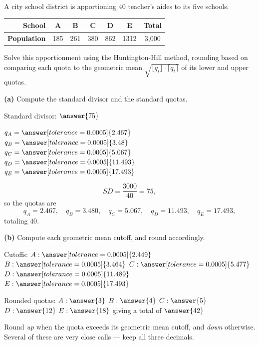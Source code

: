 \documentclass[12pt]{ximera}
\begin{document}
\begin{problem}
A city school district is apportioning $40$ teacher's aides to its five schools.

\begin{center}
\begin{tabular}{|r|c|c|c|c|c|c|}\hline
\textbf{School} & A & B & C & D & E & \textbf{Total} \\\hline
\textbf{Population} & 185 & 261 & 380 & 862 & 1312 & 3{,}000 \\\hline
\end{tabular}
\end{center}

Solve this apportionment using the Huntington-Hill method, rounding based on comparing
each quota to the geometric mean $\sqrt{\lfloor q_i\rfloor \cdot \lceil q_i\rceil}$ of
its lower and upper quotas.

\begin{prompt}
\textbf{(a)} Compute the standard divisor and the standard quotas.

Standard divisor: $\answer{75}$

\smallskip
$q_A = \answer[tolerance=0.0005]{2.467}$ \quad
$q_B = \answer[tolerance=0.0005]{3.48}$ \quad
$q_C = \answer[tolerance=0.0005]{5.067}$ \quad
$q_D = \answer[tolerance=0.0005]{11.493}$ \quad
$q_E = \answer[tolerance=0.0005]{17.493}$

\begin{feedback}
\[ SD = \frac{3000}{40} = 75, \]
so the quotas are
\[
q_A = 2.467,\quad q_B = 3.480,\quad q_C = 5.067,\quad q_D = 11.493,\quad q_E = 17.493,
\]
totaling $40$. \checkmark
\end{feedback}
\end{prompt}

\begin{prompt}
\textbf{(b)} Compute each geometric mean cutoff, and round accordingly.

Cutoffs: $A: \answer[tolerance=0.0005]{2.449}$ \quad
$B: \answer[tolerance=0.0005]{3.464}$ \quad
$C: \answer[tolerance=0.0005]{5.477}$ \quad
$D: \answer[tolerance=0.0005]{11.489}$ \quad
$E: \answer[tolerance=0.0005]{17.493}$

\smallskip
Rounded quotas: $A: \answer{3}$ \quad $B: \answer{4}$ \quad $C: \answer{5}$ \quad
$D: \answer{12}$ \quad $E: \answer{18}$ \quad giving a total of $\answer{42}$

\begin{hint}
Round \emph{up} when the quota exceeds its geometric mean cutoff, and \emph{down}
otherwise. Several of these are very close calls --- keep all three decimals.
\end{hint}


\end{prompt}
\end{problem}
\end{document}
